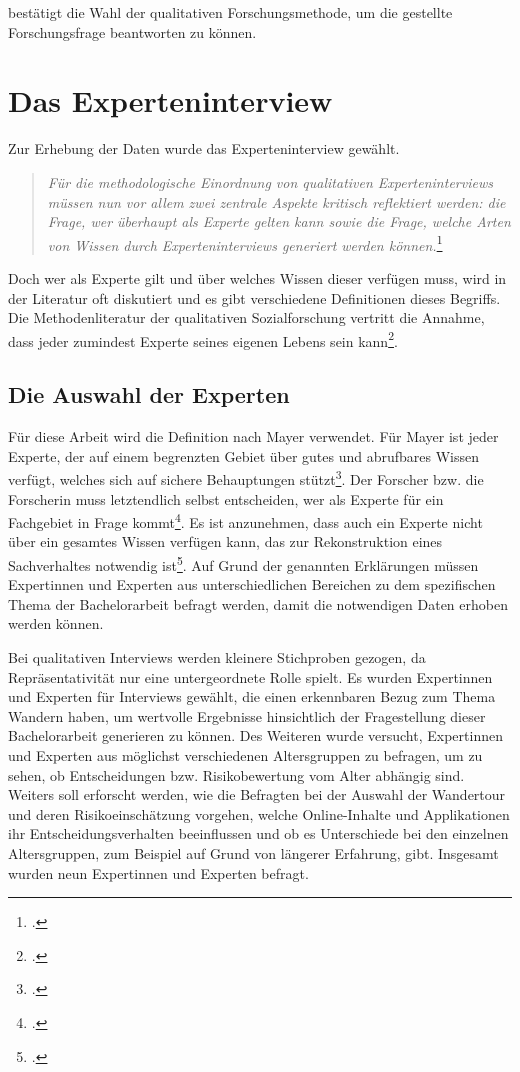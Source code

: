 bestätigt die Wahl der qualitativen Forschungsmethode, um die gestellte Forschungsfrage beantworten zu können.



\section{Das Experteninterview}

Zur Erhebung der Daten wurde das Experteninterview gewählt. 

\begin{quote}
	\textit{\glqq Für die methodologische Einordnung von qualitativen Experteninterviews müssen nun vor allem zwei zentrale Aspekte kritisch reflektiert werden: die Frage, wer überhaupt als Experte gelten kann sowie die Frage, welche Arten von Wissen durch Experteninterviews generiert werden können.\grqq}\footcite[S. 35]{kaiser}
\end{quote}

Doch wer als Experte gilt und über welches Wissen dieser verfügen muss, wird in der Literatur oft diskutiert und es gibt verschiedene Definitionen dieses Begriffs.
Die Methodenliteratur der qualitativen Sozialforschung vertritt die Annahme, dass jeder zumindest Experte seines eigenen Lebens sein kann\footcite[S. 116]{przyborski}.

\subsection{Die Auswahl der Experten}

Für diese Arbeit wird die Definition nach Mayer verwendet. Für Mayer ist jeder Experte, der auf einem begrenzten Gebiet über gutes und abrufbares Wissen verfügt, welches sich auf sichere Behauptungen stützt\footcite[S. 41]{mayer}.
Der Forscher bzw. die Forscherin muss letztendlich selbst entscheiden, wer als Experte für ein Fachgebiet in Frage kommt\footcite[S. 39]{kaiser}. Es ist anzunehmen, dass auch ein Experte nicht über ein gesamtes Wissen verfügen kann, das zur Rekonstruktion eines Sachverhaltes notwendig ist\footcite[S. 113]{glaeser}. Auf Grund der genannten Erklärungen müssen Expertinnen und Experten aus unterschiedlichen Bereichen zu dem spezifischen Thema der Bachelorarbeit befragt werden, damit die notwendigen Daten erhoben werden können.

Bei qualitativen Interviews werden kleinere Stichproben gezogen, da Repräsentativität nur eine untergeordnete Rolle spielt. Es wurden Expertinnen und Experten für Interviews gewählt, die einen erkennbaren Bezug zum Thema Wandern haben, um wertvolle Ergebnisse hinsichtlich der Fragestellung dieser Bachelorarbeit generieren zu können. Des Weiteren wurde versucht, Expertinnen und Experten aus möglichst verschiedenen Altersgruppen zu befragen, um zu sehen, ob Entscheidungen bzw. Risikobewertung vom Alter abhängig sind.  Weiters soll erforscht werden, wie die Befragten bei der Auswahl der Wandertour und deren Risikoeinschätzung vorgehen, welche Online-Inhalte und Applikationen ihr Entscheidungsverhalten beeinflussen und ob es Unterschiede bei den einzelnen Altersgruppen, zum Beispiel auf Grund von längerer Erfahrung, gibt. Insgesamt wurden neun Expertinnen und Experten befragt.

